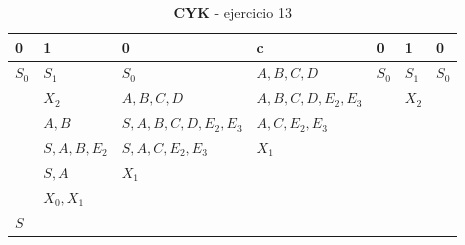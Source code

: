 \documentclass[11pt,a4paper]{article}
\begin{document}
\begin {enumerate}
\begin{table}[h]
	\centering
	\caption{\textbf{CYK} - ejercicio 13}
	\label{my-label}
	\begin{tabular}{lllllll}
		0                           & 1                                & 0                                        & c                                      & 0                          & 1                          & 0                          \\ \hline
		\multicolumn{1}{|l|}{$S_0$} & \multicolumn{1}{l|}{$S_1$}       & \multicolumn{1}{l|}{$S_0$}               & \multicolumn{1}{l|}{$A,B,C,D$}         & \multicolumn{1}{l|}{$S_0$} & \multicolumn{1}{l|}{$S_1$} & \multicolumn{1}{l|}{$S_0$} \\ \hline
		\multicolumn{1}{|l|}{}      & \multicolumn{1}{l|}{$X_2$}       & \multicolumn{1}{l|}{$A,B,C,D$}           & \multicolumn{1}{l|}{$A,B,C,D,E_2,E_3$} & \multicolumn{1}{l|}{}      & \multicolumn{1}{l|}{$X_2$} &                            \\ \cline{1-6}
		\multicolumn{1}{|l|}{}      & \multicolumn{1}{l|}{$A,B$}       & \multicolumn{1}{l|}{$S,A,B,C,D,E_2,E_3$} & \multicolumn{1}{l|}{$A,C,E_2,E_3$}     & \multicolumn{1}{l|}{}      &                            &                            \\ \cline{1-5}
		\multicolumn{1}{|l|}{}      & \multicolumn{1}{l|}{$S,A,B,E_2$} & \multicolumn{1}{l|}{$S,A,C,E_2,E_3$}     & \multicolumn{1}{l|}{$X_1$}             &                            &                            &                            \\ \cline{1-4}
		\multicolumn{1}{|l|}{}      & \multicolumn{1}{l|}{$S,A$}       & \multicolumn{1}{l|}{$X_1$}               &                                        &                            &                            &                            \\ \cline{1-3}
		\multicolumn{1}{|l|}{}      & \multicolumn{1}{l|}{$X_0,X_1$}   &                                          &                                        &                            &                            &                            \\ \cline{1-2}
		\multicolumn{1}{|l|}{$S$}   &                                  &                                          &                                        &                            &                            &                            \\ \cline{1-1}
	\end{tabular}
\end{table}

\end{enumerate}
\end{document}
